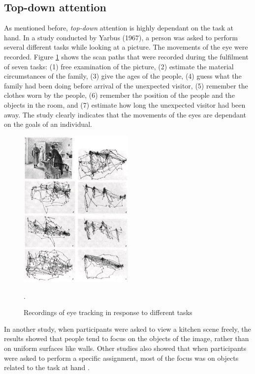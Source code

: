 \subsection{Top-down attention}\label{subsec:topdown_attention}
As mentioned before, \textit{top-down} attention is highly dependant on the task at hand. In a study conducted by Yarbus (1967), a person was asked to perform several different tasks while looking at a picture. The movements of the eye were recorded. Figure \ref{fig:eye_movement_recording} shows the scan paths that were recorded during the fulfilment of seven tasks: (1) free examination of the picture, (2) estimate the material circumstances of the family, (3) give the ages of the people, (4) guess what the family had been doing before arrival of the unexpected visitor, (5) remember the clothes worn by the people, (6) remember the position of the people and the objects in the room, and (7) estimate how long the unexpected visitor had been away. The study clearly indicates that the movements of the eyes are dependant on the goals of an individual. \cite{Yarbus1967}

\begin{figure}[h!]
	\centering
	\includegraphics[width=0.5\textwidth]{figures/eye_movement_recording.jpg}
	\caption{Recordings of eye tracking in response to different tasks \cite{sundstedt2012gazing}}.\label{fig:eye_movement_recording}
\end{figure}

In another study, when participants were asked to view a kitchen scene freely, the results showed that people tend to focus on the objects of the image, rather than on uniform surfaces like walls. Other studies also showed that when participants were asked to perform a specific assignment, most of the focus was on objects related to the task at hand \cite{sundstedt2012gazing}.

